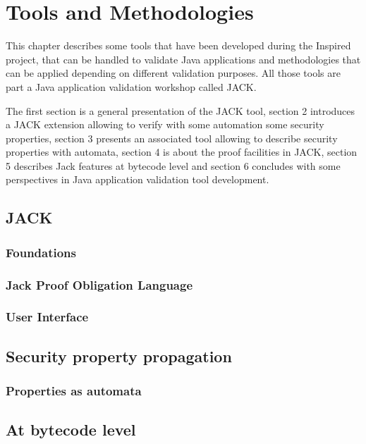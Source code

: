 \chapter{Tools and Methodologies}
This chapter describes some tools that have been developed during the Inspired project, that can be handled to validate Java applications and methodologies that can be applied depending on different validation purposes.
All those tools are part a Java application validation workshop called JACK.

The first section is a general presentation of the JACK tool, section 2 introduces a JACK extension allowing to verify with some automation some security properties, section 3 presents an associated tool allowing to describe security properties with automata, section 4 is about the proof facilities in JACK, section 5 describes Jack features at bytecode level and section 6 concludes with some perspectives in Java application validation tool development.
\section{JACK}

\subsection{Foundations}

\subsection{Jack Proof Obligation Language}

\subsection{User Interface}

%
%

\section{Security property propagation}




%
%

\subsection{Properties as automata}


\section{At bytecode level}






%

%

